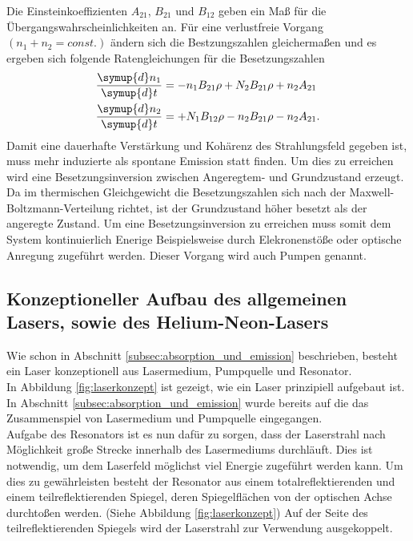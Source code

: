 Die Einsteinkoeffizienten $A_21$, $B_21$ und $B_12$
geben ein Maß für die Übergangswahrscheinlichkeiten an.
Für eine verlustfreie Vorgang
$(n_1+n_2=const.)$ ändern sich die Bestzungszahlen
gleichermaßen und es ergeben sich folgende
Ratengleichungen für die Besetzungszahlen
\begin{align}
\frac{\symup{d} n_1}{\symup{d} t} &=-n_1 B_{21}\rho + N_2 B_{21} \rho + n_2 A_{21}\\
\frac{\symup{d} n_2}{\symup{d} t} &=+N_1 B_{12}\rho - n_2 B_{21} \rho - n_2 A_{21}.
\end{align}
Damit eine dauerhafte Verstärkung
und Kohärenz des Strahlungsfeld gegeben ist,
muss mehr induzierte als spontane Emission
statt finden. Um dies zu
erreichen wird eine Besetzungsinversion
zwischen Angeregtem- und Grundzustand
erzeugt.
Da im thermischen Gleichgewicht
die Besetzungszahlen sich nach der
Maxwell-Boltzmann-Verteilung
richtet, ist der Grundzustand höher
besetzt als der angeregte Zustand.
Um eine Besetzungsinversion zu erreichen
muss somit dem System kontinuierlich
Enerige Beispielsweise durch
Elekronenstöße oder
optische Anregung zugeführt werden.
Dieser Vorgang wird auch Pumpen genannt.



\subsection{Konzeptioneller Aufbau des allgemeinen Lasers, sowie des Helium-Neon-Lasers}
\label{subsec:konzeptioneller_aufbau}

Wie schon in Abschnitt \ref{subsec:absorption_und_emission}
beschrieben, besteht ein Laser konzeptionell aus Lasermedium,
Pumpquelle und Resonator.\\
In Abbildung \ref{fig:laserkonzept} ist gezeigt,
wie ein Laser prinzipiell aufgebaut ist.
In Abschnitt \ref{subsec:absorption_und_emission}
wurde bereits auf die das Zusammenspiel von Lasermedium
und Pumpquelle eingegangen.\\
Aufgabe des Resonators ist es nun dafür zu sorgen,
dass der Laserstrahl nach Möglichkeit große Strecke innerhalb
des Lasermediums durchläuft. Dies ist notwendig,
um dem Laserfeld möglichst viel Energie zugeführt
werden kann. Um dies zu gewährleisten besteht der Resonator
aus einem totalreflektierenden und einem teilreflektierenden Spiegel,
deren Spiegelflächen von der optischen Achse durchtoßen werden.
(Siehe Abbildung \ref{fig:laserkonzept})
Auf der Seite des teilreflektierenden Spiegels wird der Laserstrahl
zur Verwendung ausgekoppelt.

